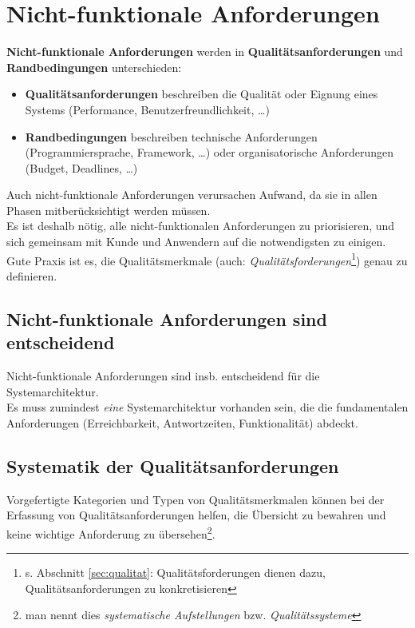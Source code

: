 \section{Nicht-funktionale Anforderungen}\label{sec:nicht-funktionale-anforderungen}

\noindent
\textbf{Nicht-funktionale Anforderungen} werden in \textbf{Qualitätsanforderungen} und \textbf{Randbedingungen} unterschieden:

\begin{itemize}
    \item \textbf{Qualitätsanforderungen} beschreiben die Qualität oder Eignung eines Systems (Performance, Benutzerfreundlichkeit, \ldots)
    \item \textbf{Randbedingungen} beschreiben technische Anforderungen (Programmiersprache, Framework, \ldots) oder organisatorische Anforderungen (Budget, Deadlines, \ldots)
\end{itemize}

\noindent
Auch nicht-funktionale Anforderungen verursachen Aufwand, da sie in allen Phasen mitberücksichtigt werden müssen.\\
Es ist deshalb nötig, alle nicht-funktionalen Anforderungen zu priorisieren, und sich gemeinsam mit Kunde und Anwendern auf die notwendigsten zu einigen.\\
Gute Praxis ist es, die Qualitätsmerkmale (auch: \textit{Qualitätsforderungen}\footnote{
    s. Abschnitt \ref{sec:qualitat}: Qualitätsforderungen dienen dazu, Qualitätsanforderungen zu konkretisieren
}) genau zu definieren.

\subsection*{Nicht-funktionale Anforderungen sind entscheidend}
Nicht-funktionale Anforderungen sind insb. entscheidend für die Systemarchitektur.\\
Es muss zumindest \textit{eine} Systemarchitektur vorhanden sein, die die fundamentalen Anforderungen (Erreichbarkeit, Antwortzeiten, Funktionalität) abdeckt.

\subsection*{Systematik der Qualitätsanforderungen}
Vorgefertigte Kategorien und Typen von Qualitätsmerkmalen können bei der Erfassung von Qualitätsanforderungen helfen, die Übersicht zu bewahren und keine wichtige Anforderung zu übersehen\footnote{man nennt dies \textit{systematische Aufstellungen} bzw. \textit{Qualitätssysteme}}.\\

